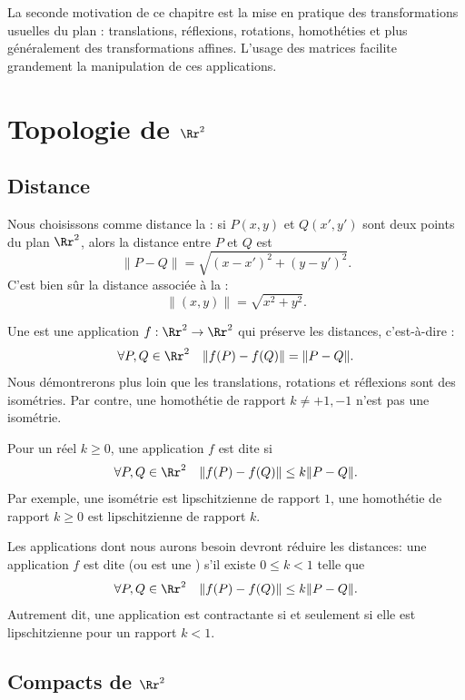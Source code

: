 \documentclass[11pt,class=report,crop=false]{standalone}
\begin{document}
La seconde motivation de ce chapitre est la mise en pratique des transformations usuelles du plan :
translations, réflexions, rotations, homothéties et plus généralement des transformations affines.
L'usage des matrices facilite grandement la manipulation de ces applications.


\section{Topologie de $\Rr^2$}

\subsection{Distance}

Nous choisissons comme distance la  : si $P(x,y)$
et $Q(x',y')$ sont deux points du plan $\Rr^2$, alors la distance entre 
$P$ et $Q$ est
$$\| P - Q\| = \sqrt{(x-x')^2+(y-y')^2}.$$
C'est bien sûr la distance associée à la  :
$$\|(x,y)\| = \sqrt{x^2+y^2}.$$

Une  est une application $f : \Rr^2 \to \Rr^2$ qui
préserve les distances, c'est-à-dire :
$$\forall P,Q \in \Rr^2 \quad \|f(P)-f(Q)\| = \|P-Q\|.$$
Nous démontrerons plus loin que les translations, rotations et réflexions sont des isométries.
Par contre, une homothétie de rapport $k\neq +1,-1$ n'est pas une isométrie.


Pour un réel $k\ge 0$, une application $f$ est dite 
si 
$$\forall P,Q \in\Rr^2 \quad \|f(P)-f(Q)\| \le k \|P-Q\|.$$
Par exemple,  une isométrie est lipschitzienne de rapport $1$,
une homothétie de rapport $k\ge 0$
est lipschitzienne de rapport $k$.

Les applications dont nous aurons besoin devront réduire les distances:
une application $f$ est dite  (ou est une ) s'il existe $0 \le k<1$
telle que 
$$\forall P,Q \in\Rr^2 \quad \|f(P)-f(Q)\| \le k \|P-Q\|.$$
Autrement dit, une application est contractante si et seulement si elle est lipschitzienne
pour un rapport $k<1$.

\subsection{Compacts de $\Rr^2$}
\end{document}

